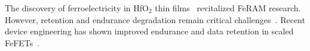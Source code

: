 The discovery of ferroelectricity in HfO$_2$ thin films~\cite{boscke2011, mueller2012} revitalized FeRAM research. 
However, retention and endurance degradation remain critical challenges~\cite{schenk2015}. 
Recent device engineering has shown improved endurance and data retention in scaled FeFETs~\cite{li2022}.
